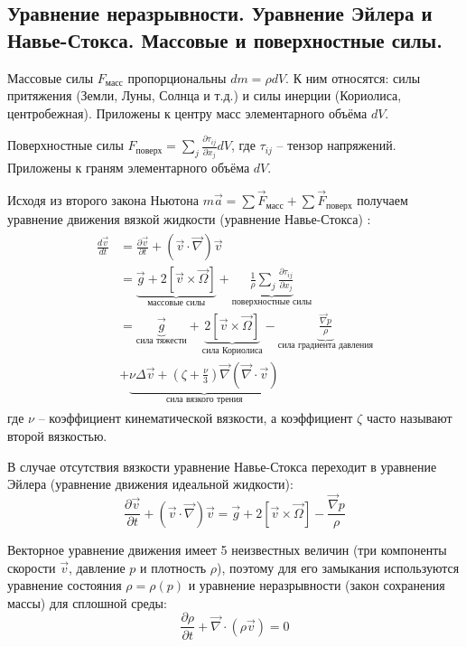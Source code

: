 \subsection{Уравнение неразрывности. Уравнение Эйлера и Навье-Стокса. Массовые и поверхностные силы.}
Массовые силы $F_\text{масс}$ пропорциональны $dm=\rho dV$.
К ним относятся: силы притяжения (Земли, Луны, Солнца и т.д.) и силы инерции (Кориолиса, центробежная).
Приложены к центру масс элементарного объёма $dV$.

Поверхностные силы $F_\text{поверх}=\sum_{j}\frac{\partial\tau_{ij}}{\partial x_{j}}dV$, где $\tau_{ij}$ -- тензор напряжений.
Приложены к граням элементарного объёма $dV$.

Исходя из второго закона Ньютона $m\vec{a}=\sum\vec{F}_\text{масс}+\sum\vec{F}_\text{поверх}$ получаем уравнение движения вязкой жидкости (уравнение Навье-Стокса) \cite{Nosov2019-6}:
\begin{align}\label{eq-2-2-1}
\begin{split}
\frac{d\vec{v}}{dt}
&=
\frac{\partial\vec{v}}{\partial t}+\left(\vec{v}\cdot\vec{\nabla}\right)\vec{v}
\\
&=
\underbrace{\vec{g}+2\left[\vec{v}\times\vec{\Omega}\right]}_\text{массовые силы}
+\underbrace{\frac{1}{\rho}\sum_{j}\frac{\partial\tau_{ij}}{\partial x_{j}}}_\text{поверхностные силы}
\\
&=
\underbrace{\vec{g}}_\text{сила тяжести}
+\underbrace{2\left[\vec{v}\times\vec{\Omega}\right]}_\text{сила Кориолиса}
-\underbrace{\frac{\vec{\nabla}p}{\rho}}_\text{сила градиента давления}
\\
&+
\underbrace{\nu\Delta\vec{v}+\left(\zeta+\frac{\nu}{3}\right)\vec{\nabla}\left(\vec{\nabla}\cdot\vec{v}\right)}_\text{сила вязкого трения}
\end{split}
\end{align}
где $\nu$ -- коэффициент кинематической вязкости, а коэффициент $\zeta$ часто называют второй вязкостью.

В случае отсутствия вязкости уравнение Навье-Стокса переходит в уравнение Эйлера (уравнение движения идеальной жидкости):
\begin{equation}\label{eq-2-2-2}
\frac{\partial\vec{v}}{\partial t}+\left(\vec{v}\cdot\vec{\nabla}\right)\vec{v}=\vec{g}+2\left[\vec{v}\times\vec{\Omega}\right]-\frac{\vec{\nabla}p}{\rho}
\end{equation}

Векторное уравнение движения имеет 5 неизвестных величин (три компоненты скорости $\vec{v}$, давление $p$ и плотность $\rho$), поэтому для его замыкания используются уравнение состояния $\rho=\rho(p)$ и уравнение неразрывности (закон сохранения массы) для сплошной среды:
\begin{equation}\label{eq-2-2-3}
\frac{\partial\rho}{\partial t}+\vec{\nabla}\cdot(\rho\vec{v})=0
\end{equation}
